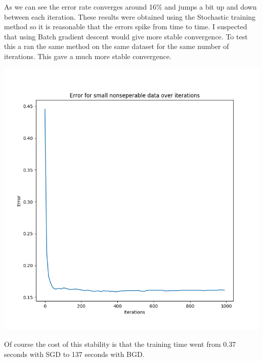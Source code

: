 \documentclass{article}
\begin{document}
As we can see the error rate converges around 16\% and jumps a bit up and down between each iteration. These results were obtained using the Stochastic training method so it is reasonable that the errors spike from time to time. 
I suspected that using Batch gradient descent would give more stable convergence. To test this a ran the same method on the same dataset for the same number of iterations. This gave a much more stable convergence.

\begin{centering}
\includegraphics[width=0.9\linewidth]{ex4_error_over_iterations_bgc.png}
\end{centering}

Of course the cost of this stability is that the training time went from 0.37 seconds with SGD to 137 seconds with BGD.
\end{document}
